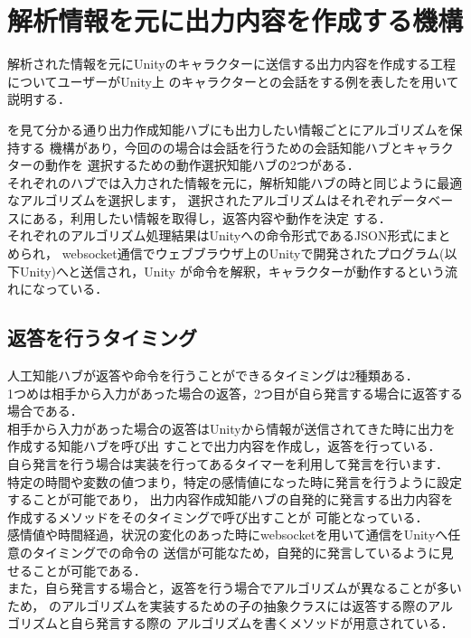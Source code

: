 \section{解析情報を元に出力内容を作成する機構}
解析された情報を元にUnityのキャラクターに送信する出力内容を作成する工程についてユーザーがUnity上
のキャラクターとの会話をする例を表したを用いて説明する．


を見て分かる通り出力作成知能ハブにも出力したい情報ごとにアルゴリズムを保持する
機構があり，今回のの場合は会話を行うための会話知能ハブとキャラクターの動作を
選択するための動作選択知能ハブの2つがある．
\\
それぞれのハブでは入力された情報を元に，解析知能ハブの時と同じように最適なアルゴリズムを選択します，
選択されたアルゴリズムはそれぞれデータベースにある，利用したい情報を取得し，返答内容や動作を決定
する．
\\
それぞれのアルゴリズム処理結果はUnityへの命令形式であるJSON形式にまとめられ，
websocket通信でウェブブラウザ上のUnityで開発されたプログラム(以下Unity)へと送信され，Unity
が命令を解釈，キャラクターが動作するという流れになっている．

\subsection{返答を行うタイミング}
人工知能ハブが返答や命令を行うことができるタイミングは2種類ある．
\\
1つめは相手から入力があった場合の返答，2つ目が自ら発言する場合に返答する場合である．
\\
相手から入力があった場合の返答はUnityから情報が送信されてきた時に出力を作成する知能ハブを呼び出
すことで出力内容を作成し，返答を行っている．
\\
自ら発言を行う場合は実装を行ってあるタイマーを利用して発言を行います．
特定の時間や変数の値つまり，特定の感情値になった時に発言を行うように設定することが可能であり，
出力内容作成知能ハブの自発的に発言する出力内容を作成するメソッドをそのタイミングで呼び出すことが
可能となっている．
\\
感情値や時間経過，状況の変化のあった時にwebsocketを用いて通信をUnityへ任意のタイミングでの命令の
送信が可能なため，自発的に発言しているように見せることが可能である．
\\
また，自ら発言する場合と，返答を行う場合でアルゴリズムが異なることが多いため，
のアルゴリズムを実装するための子の抽象クラスには返答する際のアルゴリズムと自ら発言する際の
アルゴリズムを書くメソッドが用意されている．
\\
